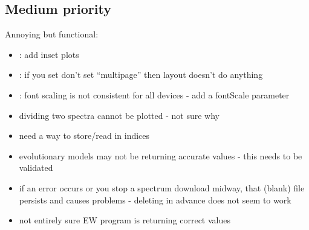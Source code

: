\documentclass[letterpaper,10pt,english]{sphinxmanual}
\begin{document}
\subsection{Medium priority}
\label{bugs:medium-priority}
Annoying but functional:
\begin{itemize}
\item {} 
: add inset plots

\item {} 
: if you set don't set ``multipage'' then layout doesn't do anything

\item {} 
: font scaling is not consistent for all devices - add a fontScale parameter

\item {} 
dividing two spectra cannot be plotted - not sure why

\item {} 
need a way to store/read in indices

\item {} 
evolutionary models may not be returning accurate values - this needs to be validated

\item {} 
if an error occurs or you stop a spectrum download midway, that (blank) file persists and causes problems - deleting in advance does not seem to work

\item {} 
not entirely sure EW program is returning correct values

\end{itemize}
\end{document}
